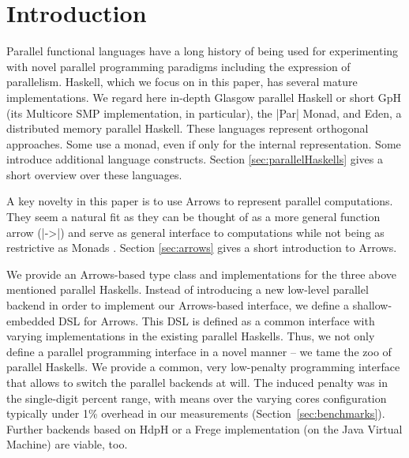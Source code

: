 
\section{Introduction}
\label{sec:introduction}

Parallel functional languages have a long history of being used for experimenting with novel parallel programming paradigms including the expression of parallelism. Haskell, which we focus on in this paper, has  several mature implementations. We regard here in-depth
Glasgow parallel Haskell or short GpH (its Multicore SMP implementation, in particular), the
|Par| Monad, and Eden, a distributed memory parallel Haskell. These
languages represent orthogonal approaches. Some use a monad, even if
only for the internal representation. Some introduce additional
language constructs. Section \ref{sec:parallelHaskells} gives a short overview over these languages.

A key novelty in this paper is to use Arrows to represent parallel computations. They seem a natural fit as they can be thought of as a more general function arrow (|->|) and serve as general interface to computations while not being as restrictive as Monads \citep{HughesArrows}. Section \ref{sec:arrows} gives a short introduction to Arrows.

We provide an Arrows-based type class and implementations for the three above mentioned parallel Haskells.
Instead of 
introducing a new low-level parallel backend in order to implement our
Arrows-based interface, we define a shallow-embedded DSL for Arrows. This DSL
is defined as a common interface with varying implementations in
the existing parallel Haskells. Thus, we not only define a parallel programming interface in a
novel manner -- we tame the zoo of parallel Haskells. We provide a
common, very low-penalty programming interface that allows to switch
the parallel backends at will. The induced penalty was in the single-digit percent range, with means over the varying cores configuration typically under 1\% overhead in our measurements (Section~\ref{sec:benchmarks}). Further backends based on HdpH or a Frege implementation (on the Java Virtual Machine) are viable, too.

